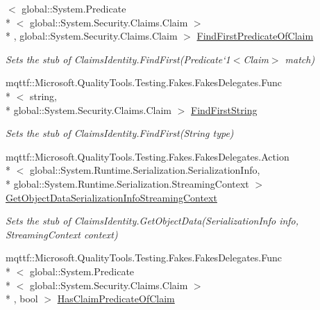 \begin{DoxyCompactItemize}
$<$ global\-::\-System.\-Predicate\\*
$<$ global\-::\-System.\-Security.\-Claims.\-Claim $>$\\*
, global\-::\-System.\-Security.\-Claims.\-Claim $>$ \hyperlink{class_system_1_1_security_1_1_principal_1_1_fakes_1_1_stub_generic_identity_a3e1c80693dcd6249b162098e4dae5a00}{Find\-First\-Predicate\-Of\-Claim}
\begin{DoxyCompactList}\small\item\em Sets the stub of Claims\-Identity.\-Find\-First(Predicate`1$<$Claim$>$ match)\end{DoxyCompactList}\item 
mqttf\-::\-Microsoft.\-Quality\-Tools.\-Testing.\-Fakes.\-Fakes\-Delegates.\-Func\\*
$<$ string, \\*
global\-::\-System.\-Security.\-Claims.\-Claim $>$ \hyperlink{class_system_1_1_security_1_1_principal_1_1_fakes_1_1_stub_generic_identity_a3bab526b932b3462e5c3123bd08a1a96}{Find\-First\-String}
\begin{DoxyCompactList}\small\item\em Sets the stub of Claims\-Identity.\-Find\-First(\-String type)\end{DoxyCompactList}\item 
mqttf\-::\-Microsoft.\-Quality\-Tools.\-Testing.\-Fakes.\-Fakes\-Delegates.\-Action\\*
$<$ global\-::\-System.\-Runtime.\-Serialization.\-Serialization\-Info, \\*
global\-::\-System.\-Runtime.\-Serialization.\-Streaming\-Context $>$ \hyperlink{class_system_1_1_security_1_1_principal_1_1_fakes_1_1_stub_generic_identity_a6429aafc5e18889319e082b3b13c8a25}{Get\-Object\-Data\-Serialization\-Info\-Streaming\-Context}
\begin{DoxyCompactList}\small\item\em Sets the stub of Claims\-Identity.\-Get\-Object\-Data(\-Serialization\-Info info, Streaming\-Context context)\end{DoxyCompactList}\item 
mqttf\-::\-Microsoft.\-Quality\-Tools.\-Testing.\-Fakes.\-Fakes\-Delegates.\-Func\\*
$<$ global\-::\-System.\-Predicate\\*
$<$ global\-::\-System.\-Security.\-Claims.\-Claim $>$\\*
, bool $>$ \hyperlink{class_system_1_1_security_1_1_principal_1_1_fakes_1_1_stub_generic_identity_a811a8c4284cba0c2d96e7b96e21f9f44}{Has\-Claim\-Predicate\-Of\-Claim}

\end{DoxyCompactItemize}
